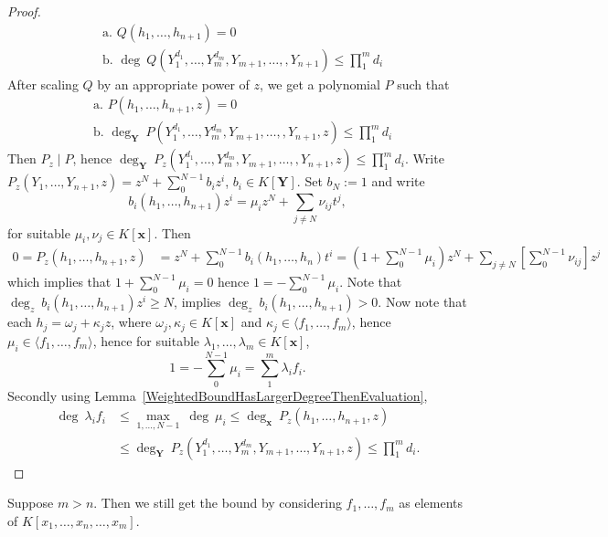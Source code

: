 \begin{proof}
    \begin{align*}
        &\text{a. } Q(h_1,\dots,h_{n+1})=0\\
        &\text{b. } \deg\ Q(Y_1^{d_1},\dots,Y_m^{d_m},Y_{m+1},\dots,,Y_{n+1}) \leq \prod_1^m d_i
    \end{align*}
    After scaling $Q$ by an appropriate power of $z$, we get a polynomial $P$ such that 
    \begin{align*}
        &\text{a. } P(h_1,\dots,h_{n+1},z)=0\\
        &\text{b. } \deg_{\mathbf{Y}} \ P(Y_1^{d_1},\dots,Y_m^{d_m},Y_{m+1},\dots,,Y_{n+1},z) \leq \prod_1^m d_i
    \end{align*}
    Then $P_z\mid P$, hence $\deg_{\mathbf{Y}}\ P_z(Y_1^{d_1},\dots,Y_m^{d_m},Y_{m+1},\dots,,Y_{n+1},z) \leq \prod_1^m d_i$.
    Write $P_z(Y_1,\dots,Y_{n+1},z) = z^N+\sum_0^{N-1} b_iz^i$, $b_i\in K[\mathbf{Y}]$. Set $b_N := 1$ and write $$b_i(h_1,\dots,h_{n+1})z^i=\mu_iz^N+ \sum_{j\neq N} \nu_{ij} t^j,$$ 
    for suitable $\mu_i,\nu_j\in K[\mathbf{x}]$. Then 
    \begin{align*}
        0 = P_z(h_1,\dots,h_{n+1},z) &= z^N + \sum_0^{N-1}b_i(h_1,\dots,h_n)t^i = (1+ \sum_0^{N-1}\mu_i)z^N + \sum_{j\neq N}\left[\sum_0^{N-1} \nu_{ij}\right] z^j
    \end{align*}
    which implies that $1+ \sum_0^{N-1}\mu_i =0$ hence $1 = -\sum_0^{N-1} \mu_i$. Note that $\deg_z \ b_i(h_1,\dots,h_{n+1})z^i \geq N$, implies $\deg_z \ b_i(h_1,\dots,h_{n+1})>0$. Now note that each $h_j = \omega_j+\kappa_jz$, where $\omega_j,\kappa_j\in K[\mathbf{x}]$ and $\kappa_j\in \langle f_1,\dots,f_m\rangle$, hence $\mu_i\in \langle f_1,\dots,f_m\rangle$, hence for suitable $\lambda_1,\dots,\lambda_m\in K[\mathbf{x}]$,
    $$1 = -\sum_0^{N-1} \mu_i =\sum_1^m \lambda_i f_i.$$
    Secondly using Lemma~\ref{WeightedBoundHasLargerDegreeThenEvaluation},
    \begin{align*} 
        \deg\ \lambda_i f_i &\leq \max_{1,\dots,N-1}\ \deg \ \mu_i \leq \deg_{\mathbf{x}} \ P_z(h_1,\dots,h_{n+1},z)\\ &\leq \deg_{\mathbf{Y}}\ P_z(Y_1^{d_1},\dots,Y_{m}^{d_m},Y_{m+1},\dots,Y_{n+1},z) \leq \prod_1^m d_i. 
    \end{align*}
    \end{proof}
    \begin{remark}
        Suppose $m>n$. Then we still get the bound by considering $f_1,\dots,f_m$ as elements of $K[x_1,\dots,x_n,\dots,x_m]$.
    \end{remark} 